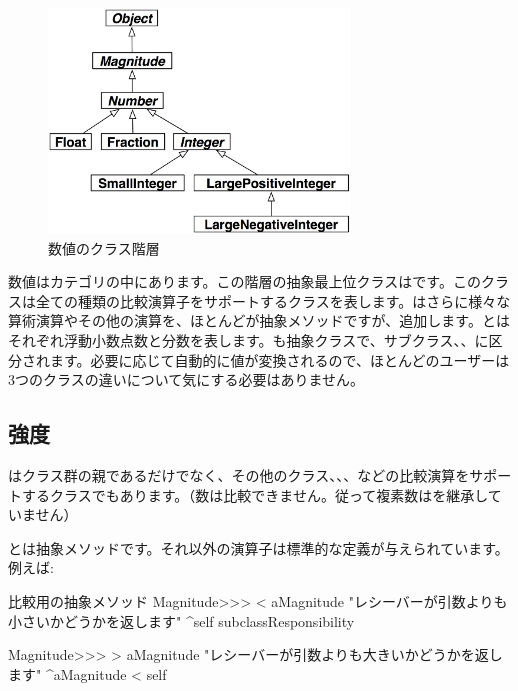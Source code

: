 \documentclass[a4paper,10pt,twoside]{book}
\begin{document}
\begin{figure}[ht]
\centerline {\includegraphics[width=8cm]{NumberHierarchy}}
\caption{数値のクラス階層 }
\end{figure}

数値はカテゴリの中にあります。この階層の抽象最上位クラスはです。このクラスは全ての種類の比較演算子をサポートするクラスを表します。はさらに様々な算術演算やその他の演算を、ほとんどが抽象メソッドですが、追加します。とはそれぞれ浮動小数点数と分数を表します。も抽象クラスで、サブクラス、、に区分されます。必要に応じて自動的に値が変換されるので、ほとんどのユーザーは3つのクラスの違いについて気にする必要はありません。

\subsection{強度}

はクラス群の親であるだけでなく、その他のクラス、、、などの比較演算をサポートするクラスでもあります。（数は比較できません。従って複素数はを継承していません）

とは抽象メソッドです。それ以外の演算子は標準的な定義が与えられています。例えば:

\begin{method}{比較用の抽象メソッド}
Magnitude>>> < aMagnitude 
    "レシーバーが引数よりも小さいかどうかを返します"
    ^self subclassResponsibility

Magnitude>>> > aMagnitude 
    "レシーバーが引数よりも大きいかどうかを返します"
    ^aMagnitude < self
\end{method}
\end{document}
